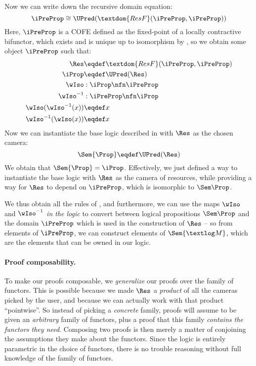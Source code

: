 Now we can write down the recursive domain equation:
\[ \iPreProp \cong \UPred(\textdom{ResF}(\iPreProp, \iPreProp)) \]
Here, $\iPreProp$ is a COFE defined as the fixed-point of a locally contractive bifunctor, which exists and is unique up to isomorphism by , so we obtain some object $\iPreProp$ such that:
\begin{align*}
  \Res &\eqdef \textdom{ResF}(\iPreProp, \iPreProp) \\
  \iProp &\eqdef \UPred(\Res) \\
	\wIso &: \iProp \nfn \iPreProp \\
	\wIso^{-1} &: \iPreProp \nfn \iProp \\
  \wIso(\wIso^{-1}(x)) &\eqdef x \\
  \wIso^{-1}(\wIso(x)) &\eqdef x
\end{align*}
Now we can instantiate the base logic described in  with $\Res$ as the chosen camera:
\[ \Sem{\Prop} \eqdef \UPred(\Res) \]
We obtain that $\Sem{\Prop} = \iProp$.
Effectively, we just defined a way to instantiate the base logic with $\Res$ as the camera of resources, while providing a way for $\Res$ to depend on $\iPreProp$, which is isomorphic to $\Sem\Prop$.

We thus obtain all the rules of , and furthermore, we can use the maps $\wIso$ and $\wIso^{-1}$ \emph{in the logic} to convert between logical propositions $\Sem\Prop$ and the domain $\iPreProp$ which is used in the construction of $\Res$ -- so from elements of $\iPreProp$, we can construct elements of $\Sem{\textlog M}$, which are the elements that can be owned in our logic.

\paragraph{Proof composability.}
To make our proofs composable, we \emph{generalize} our proofs over the family of functors.
This is possible because we made $\Res$ a \emph{product} of all the cameras picked by the user, and because we can actually work with that product ``pointwise''.
So instead of picking a \emph{concrete} family, proofs will assume to be given an \emph{arbitrary} family of functors, plus a proof that this family \emph{contains the functors they need}.
Composing two proofs is then merely a matter of conjoining the assumptions they make about the functors.
Since the logic is entirely parametric in the choice of functors, there is no trouble reasoning without full knowledge of the family of functors.

